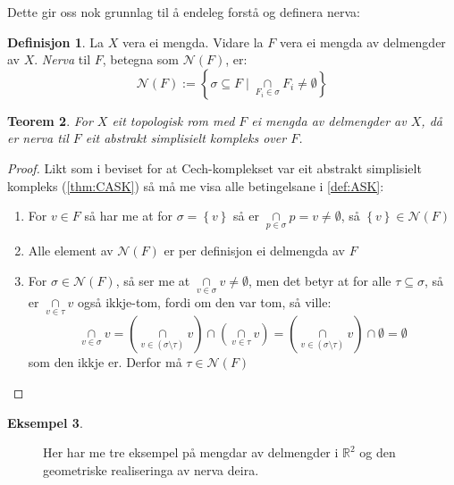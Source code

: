 \documentclass[a4paper, titlepage, 12pt, norsk]{article}
\theoremstyle{plain}
\newtheorem{theorem}{Teorem}[section]
\theoremstyle{definition}
\newtheorem{definition}[theorem]{Definisjon}
\newtheorem{example}[theorem]{Eksempel}
\newcommand{\Rb}{\mathbb{R}}
\newcommand{\Nc}{\mathcal{N}}
\newcommand{\intersect}{ \mathop{\cap}\limits } %
\newcommand{\set}[1]{ \left \{ #1 \right \} } %
\begin{document}
\begin{theroem}
Dette gir oss nok grunnlag til å endeleg forstå og definera nerva:

\begin{definition} %
	La $X$ vera ei mengda. Vidare la $F$ vera ei mengda av delmengder av $X$. \emph{Nerva} til $F$, betegna som $\Nc(F)$, er:
	\begin{equation*}
		\Nc(F) := \left \{ \sigma \subseteq F \mid \intersect_{ F_i \in \sigma } F_i \neq \emptyset \right \}
	\end{equation*}
\end{definition}

\begin{theorem}
	For $X$ eit topologisk rom med $F$ ei mengda av delmengder av $X$, då er nerva til $F$ eit abstrakt simplisielt kompleks over $F$.
\end{theorem}

\begin{proof}
	Likt som i beviset for at Cech-komplekset var eit abstrakt simplisielt kompleks (\autoref{thm:CASK}) så må me visa alle betingelsane i \autoref{def:ASK}:
	\begin{enumerate}
		\item{ 
			For \( v \in F \) så har me at for \( \sigma = \set{ v } \) så er \( \intersect_{ p \in \sigma } p = v \neq \emptyset \), så \( \set{v} \in \Nc(F) \) 
		}
		\item{ 
			Alle element av \( \Nc(F) \) er per definisjon ei delmengda av \( F \)
		}
		\item{  
			For \( \sigma \in \Nc(F) \), så ser me at \( \intersect_{v\in\sigma} v \neq \emptyset \), men det betyr at for alle \( \tau \subseteq \sigma \), så er \( \intersect_{v\in\tau} v \) også ikkje-tom, fordi om den var tom, så ville: 
			\[ 
				\intersect_{v\in\sigma} v = \left( \intersect_{v\in(\sigma\setminus\tau)} v \right) \intersect \left( \intersect_{v\in\tau} v \right) = \left( \intersect_{v\in(\sigma\setminus\tau)} v \right) \intersect \emptyset = \emptyset 
			\] 
			som den ikkje er. Derfor må \( \tau \in \Nc(F) \)
		}

	\end{enumerate}
\end{proof}

\begin{example}
	\phantom{abc}
	\begin{figure}[htbp]
		\begin{center}
			
		\end{center}
		\caption{Her har me tre eksempel på mengdar av delmengder i \( \Rb^2 \) og den geometriske realiseringa av nerva deira.}
	\end{figure}
\end{example}


\end{theroem}
\end{document}
